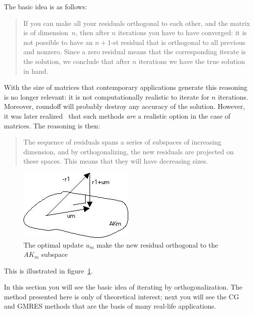 The basic idea is as follows:
\begin{quote}
  If you can make all your residuals orthogonal to each other, and the
  matrix is of dimension~$n$, then after $n$ iterations you have to
  have converged: it is not possible to have an $n+1$-st residual that
  is orthogonal to all previous and nonzero. Since a zero residual
  means that the corresponding iterate is the solution, we conclude
  that after $n$ iterations we have the true solution in hand.
\end{quote}
With the size of matrices that contemporary applications generate this
reasoning is no longer relevant: it is not computationally realistic
to iterate for $n$ iterations. Moreover, roundoff will probably destroy any
accuracy of the solution.
%
However, it was later realized~\cite{Reid1971:cg} that such methods
\emph{are} a realistic option in the case of  matrices. The
reasoning is then:
\begin{quote}
  The sequence of residuals spans a series of subspaces of increasing
  dimension, and by orthogonalizing, the new residuals are projected on
  these spaces. This means that they will have decreasing sizes.
\end{quote}
\begin{figure}[ht]
  \includegraphics[scale=.7]{graphics/projection}
  \caption{The optimal update $u_m$ make the new residual orthogonal to
    the $AK_m$ subspace}
  \label{fig:res-projection}
\end{figure}
This is illustrated in figure~\ref{fig:res-projection}.

In this section you will see the basic idea of iterating by
orthogonalization. The method presented here is only of theoretical
interest; next you will see the \acf{CG} and \acf{GMRES} methods that
are the basis of many real-life applications.

